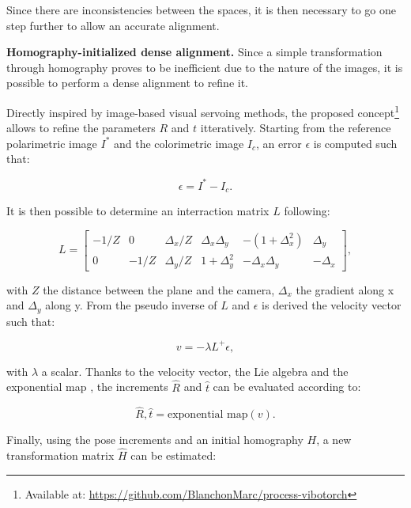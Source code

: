 Since there are inconsistencies between the spaces, it is then necessary to go one step further to allow an accurate alignment.

\textbf{Homography-initialized dense alignment.} Since a simple transformation through homography proves to be inefficient due to the nature of the images, it is possible to perform a dense alignment to refine it.

Directly inspired by image-based visual servoing methods, the proposed concept\footnote{Available at: \url{https://github.com/BlanchonMarc/process-vibotorch} } allows to refine the parameters $R$ and $t$ itteratively. 
Starting from the reference polarimetric image $I^*$ and the colorimetric image $I_c$, an error $\epsilon$ is computed such that:

\begin{equation}
\epsilon = I^* - I_c.
\end{equation}

It is then possible to determine an interraction matrix $L$  \cite{chaumette2006visual} following: 

\begin{equation}
L = \begin{bmatrix}
-1/Z       & 0 & \Delta_{x}/Z & \Delta_{x}\Delta_{y} & -(1+\Delta_{x}^2) & \Delta_{y}  \\
0      & -1/Z &  \Delta_{y}/Z & 1 +  \Delta_{y}^2 & -\Delta_{x}\Delta_{y} & -\Delta_{x} 

\end{bmatrix},
\end{equation}

with $Z$ the distance between the plane and the camera, $\Delta_x $ the gradient along x and $\Delta_y $ along y.
From the pseudo inverse of $L$ and $\epsilon$ is derived the velocity vector such that: 

\begin{equation}
v = -\lambda L^+ \epsilon,
\end{equation}

with $\lambda$ a scalar. Thanks to the velocity vector, the Lie algebra and the exponential map \cite{reutenauer2003free}, the increments $\hat{R}$ and $\hat{t}$ can be evaluated according to: 

\begin{equation}
\hat{R}, \hat{t} = \textrm{exponential map}(v).
\end{equation}

Finally, using the pose increments and an initial homography $H$, a new transformation matrix $\hat{H}$ can be estimated:


